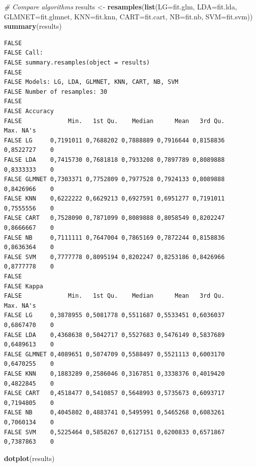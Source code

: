 \documentclass[]{article}
\newenvironment{Shaded}{\begin{snugshade}}{\end{snugshade}}
\newcommand{\KeywordTok}[1]{\textcolor[rgb]{0.13,0.29,0.53}{\textbf{#1}}}
\newcommand{\DataTypeTok}[1]{\textcolor[rgb]{0.13,0.29,0.53}{#1}}
\newcommand{\StringTok}[1]{\textcolor[rgb]{0.31,0.60,0.02}{#1}}
\newcommand{\CommentTok}[1]{\textcolor[rgb]{0.56,0.35,0.01}{\textit{#1}}}
\newcommand{\NormalTok}[1]{#1}
\begin{document}
\begin{Shaded}
\begin{Highlighting}[]
\CommentTok{# Compare algorithms}
\NormalTok{results <-}\StringTok{ }\KeywordTok{resamples}\NormalTok{(}\KeywordTok{list}\NormalTok{(}\DataTypeTok{LG=}\NormalTok{fit.glm, }\DataTypeTok{LDA=}\NormalTok{fit.lda, }\DataTypeTok{GLMNET=}\NormalTok{fit.glmnet, }\DataTypeTok{KNN=}\NormalTok{fit.knn,}
    \DataTypeTok{CART=}\NormalTok{fit.cart, }\DataTypeTok{NB=}\NormalTok{fit.nb, }\DataTypeTok{SVM=}\NormalTok{fit.svm))}
\KeywordTok{summary}\NormalTok{(results)}
\end{Highlighting}
\end{Shaded}

\begin{verbatim}
FALSE 
FALSE Call:
FALSE summary.resamples(object = results)
FALSE 
FALSE Models: LG, LDA, GLMNET, KNN, CART, NB, SVM 
FALSE Number of resamples: 30 
FALSE 
FALSE Accuracy 
FALSE             Min.   1st Qu.    Median      Mean   3rd Qu.      Max. NA's
FALSE LG     0,7191011 0,7688202 0,7888889 0,7916644 0,8158836 0,8522727    0
FALSE LDA    0,7415730 0,7681818 0,7933208 0,7897789 0,8089888 0,8333333    0
FALSE GLMNET 0,7303371 0,7752809 0,7977528 0,7924133 0,8089888 0,8426966    0
FALSE KNN    0,6222222 0,6629213 0,6927591 0,6951277 0,7191011 0,7555556    0
FALSE CART   0,7528090 0,7871099 0,8089888 0,8058549 0,8202247 0,8666667    0
FALSE NB     0,7111111 0,7647004 0,7865169 0,7872244 0,8158836 0,8636364    0
FALSE SVM    0,7777778 0,8095194 0,8202247 0,8253186 0,8426966 0,8777778    0
FALSE 
FALSE Kappa 
FALSE             Min.   1st Qu.    Median      Mean   3rd Qu.      Max. NA's
FALSE LG     0,3878955 0,5081778 0,5511687 0,5533451 0,6036037 0,6867470    0
FALSE LDA    0,4368638 0,5042717 0,5527683 0,5476149 0,5837689 0,6489613    0
FALSE GLMNET 0,4089651 0,5074709 0,5588497 0,5521113 0,6003170 0,6470255    0
FALSE KNN    0,1883289 0,2586046 0,3167851 0,3338376 0,4019420 0,4822845    0
FALSE CART   0,4518477 0,5410857 0,5648993 0,5735673 0,6093717 0,7194805    0
FALSE NB     0,4045802 0,4883741 0,5495991 0,5465268 0,6083261 0,7060134    0
FALSE SVM    0,5225464 0,5858267 0,6127151 0,6200833 0,6571867 0,7387863    0
\end{verbatim}

\begin{Shaded}
\begin{Highlighting}[]
\KeywordTok{dotplot}\NormalTok{(results)}
\end{Highlighting}
\end{Shaded}
\end{document}
